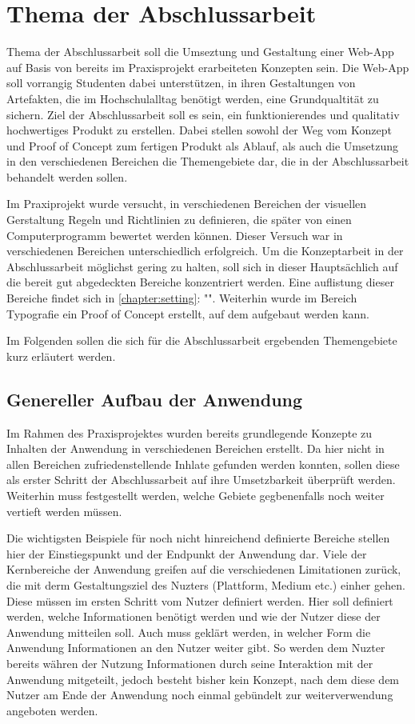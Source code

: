 \section{Thema der Abschlussarbeit}
Thema der Abschlussarbeit soll die Umseztung und Gestaltung einer Web-App auf Basis von bereits im Praxisprojekt erarbeiteten Konzepten sein.
Die Web-App soll vorrangig Studenten dabei unterstützen, in ihren Gestaltungen von Artefakten, die im Hochschulalltag benötigt werden, eine Grundqualtität zu sichern.
Ziel der Abschlussarbeit soll es sein, ein funktionierendes und qualitativ hochwertiges Produkt zu erstellen.
Dabei stellen sowohl der Weg vom Konzept und Proof of Concept zum fertigen Produkt als Ablauf, als auch die Umsetzung in den verschiedenen Bereichen die Themengebiete dar, die in der Abschlussarbeit behandelt werden sollen.

Im Praxiprojekt wurde versucht, in verschiedenen Bereichen der visuellen Gerstaltung Regeln und Richtlinien zu definieren, die später von einen Computerprogramm bewertet werden können. Dieser Versuch war in verschiedenen Bereichen unterschiedlich erfolgreich. Um die Konzeptarbeit in der Abschlussarbeit möglichst gering zu halten, soll sich in dieser Hauptsächlich auf die bereit gut abgedeckten Bereiche konzentriert werden. Eine auflistung dieser Bereiche findet sich in \autoref{chapter:setting}: "".
Weiterhin wurde im Bereich Typografie ein Proof of Concept erstellt, auf dem aufgebaut werden kann.

Im Folgenden sollen die sich für die Abschlussarbeit ergebenden Themengebiete kurz erläutert werden.

\subsection{Genereller Aufbau der Anwendung}
\label{chapter:setting}
Im Rahmen des Praxisprojektes wurden bereits grundlegende Konzepte zu Inhalten der Anwendung in verschiedenen Bereichen erstellt. Da hier nicht in allen Bereichen zufriedenstellende Inhlate gefunden werden konnten, sollen diese als erster Schritt der Abschlussarbeit auf ihre Umsetzbarkeit überprüft werden. Weiterhin muss festgestellt werden, welche Gebiete gegbenenfalls noch weiter vertieft werden müssen.

Die wichtigsten Beispiele für noch nicht hinreichend definierte Bereiche stellen hier der Einstiegspunkt und der Endpunkt der Anwendung dar.
Viele der Kernbereiche der Anwendung greifen auf die verschiedenen Limitationen zurück, die mit derm Gestaltungsziel des Nuzters (Plattform, Medium etc.) einher gehen. Diese müssen im ersten Schritt vom Nutzer definiert werden. Hier soll definiert werden, welche Informationen benötigt werden und wie der Nutzer diese der Anwendung mitteilen soll.
Auch muss geklärt werden, in welcher Form die Anwendung Informationen an den Nutzer weiter gibt. So werden dem Nuzter bereits währen der Nutzung Informationen durch seine Interaktion mit der Anwendung mitgeteilt, jedoch besteht bisher kein Konzept, nach dem diese dem Nutzer am Ende der Anwendung noch einmal gebündelt zur weiterverwendung angeboten werden.

